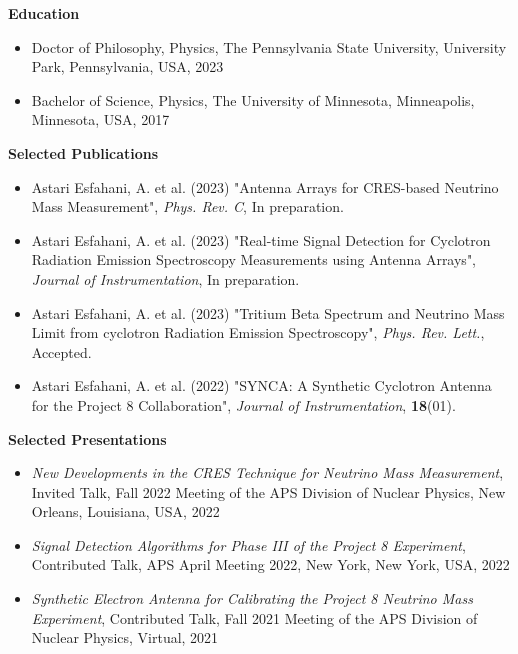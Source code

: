 
\textbf{Education}
\begin{itemize}
    \item Doctor of Philosophy, Physics, The Pennsylvania State University, University Park, Pennsylvania, USA, 2023
    \item Bachelor of Science, Physics, The University of Minnesota, Minneapolis, Minnesota, USA, 2017
\end{itemize}

\textbf{Selected Publications}
\begin{itemize}
    \item Astari Esfahani, A. et al. (2023) "Antenna Arrays for CRES-based Neutrino Mass Measurement", \emph{Phys. Rev. C}, In preparation.
    \item Astari Esfahani, A. et al. (2023) "Real-time Signal Detection for Cyclotron Radiation Emission Spectroscopy Measurements using Antenna Arrays", \emph{Journal of Instrumentation}, In preparation.
    \item Astari Esfahani, A. et al. (2023) "Tritium Beta Spectrum and Neutrino Mass Limit from cyclotron Radiation Emission Spectroscopy", \emph{Phys. Rev. Lett.}, Accepted.
    \item Astari Esfahani, A. et al. (2022) "SYNCA: A Synthetic Cyclotron Antenna for the Project 8 Collaboration", \emph{Journal of Instrumentation}, \textbf{18}(01).
\end{itemize}

\textbf{Selected Presentations}
\begin{itemize}
    \item \emph{New Developments in the CRES Technique for Neutrino Mass Measurement}, Invited Talk, Fall 2022 Meeting of the APS Division of Nuclear Physics, New Orleans, Louisiana, USA, 2022
    \item \emph{Signal Detection Algorithms for Phase III of the Project 8 Experiment}, Contributed Talk, APS April Meeting 2022, New York, New York, USA, 2022
    \item \emph{Synthetic Electron Antenna for Calibrating the Project 8 Neutrino Mass Experiment}, Contributed Talk, Fall 2021 Meeting of the APS Division of Nuclear Physics, Virtual, 2021
\end{itemize}

